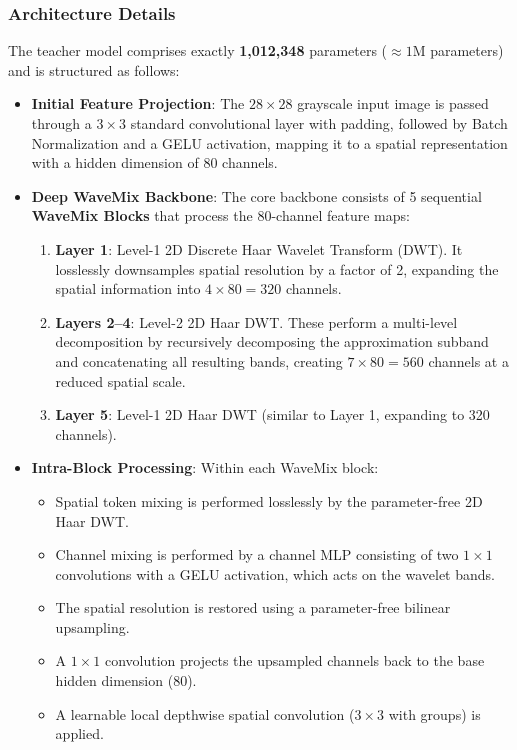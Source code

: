 \documentclass[12pt,a4paper]{article}
\begin{document}
\subsubsection{Architecture Details}
The teacher model comprises exactly \textbf{1,012,348} parameters ($\approx 1\text{M}$ parameters) and is structured as follows:
\begin{itemize}
    \item \textbf{Initial Feature Projection}: The $28 \times 28$ grayscale input image is passed through a $3 \times 3$ standard convolutional layer with padding, followed by Batch Normalization and a GELU activation, mapping it to a spatial representation with a hidden dimension of $80$ channels.
    \item \textbf{Deep WaveMix Backbone}: The core backbone consists of 5 sequential \textbf{WaveMix Blocks} that process the 80-channel feature maps:
          \begin{enumerate}
              \item \textbf{Layer 1}: Level-1 2D Discrete Haar Wavelet Transform (DWT). It losslessly downsamples spatial resolution by a factor of 2, expanding the spatial information into $4 \times 80 = 320$ channels.
              \item \textbf{Layers 2--4}: Level-2 2D Haar DWT. These perform a multi-level decomposition by recursively decomposing the approximation subband and concatenating all resulting bands, creating $7 \times 80 = 560$ channels at a reduced spatial scale.
              \item \textbf{Layer 5}: Level-1 2D Haar DWT (similar to Layer 1, expanding to 320 channels).
          \end{enumerate}
    \item \textbf{Intra-Block Processing}: Within each WaveMix block:
          \begin{itemize}
              \item Spatial token mixing is performed losslessly by the parameter-free 2D Haar DWT.
              \item Channel mixing is performed by a channel MLP consisting of two $1 \times 1$ convolutions with a GELU activation, which acts on the wavelet bands.
              \item The spatial resolution is restored using a parameter-free bilinear upsampling.
              \item A $1 \times 1$ convolution projects the upsampled channels back to the base hidden dimension ($80$).
              \item A learnable local depthwise spatial convolution ($3 \times 3$ with groups) is applied.

\end{itemize}
\end{itemize}
\end{document}
